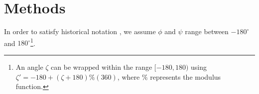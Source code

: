 \documentclass[fleqn,10pt]{wlpeerj} %
\newcommand{\Fig}[1]{Fig.~\ref{#1}}
\begin{document}

\section*{Methods}

In order to satisfy historical notation \citep{Berg2006,Alberts2002,Laskowski1993,Laskowski2003}, we assume $\phi$ and $\psi$ range between $-180^\circ$ and $180^\circ$\footnote{An angle $\zeta$ can be wrapped within the range $[-180,180)$ using $\zeta' = - 180 + (\zeta + 180) \% (360)$, where $\%$ represents the modulus function.}.
\end{document}
